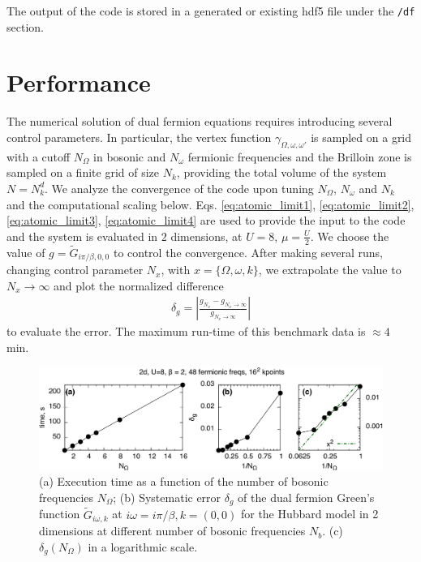\documentclass[3p,times,procedia]{elsarticle}
\begin{document}
The output of the code is stored in a generated or existing hdf5 file under the \texttt{/df} section.

\section{Performance}

The numerical solution of dual fermion equations requires introducing several control parameters. In particular,
the vertex function $\gamma_{\Omega,\omega,\omega'}$ is sampled on a grid with a cutoff $N_\Omega$ in bosonic and $N_{\omega}$ fermionic frequencies and the Brilloin zone is sampled on a finite grid of size $N_k$, providing the total volume of the system $N=N_k^d$. We analyze the convergence of the code upon tuning $N_{\Omega}$, $N_{\omega}$ and $N_k$ and the computational scaling below. Eqs. \ref{eq:atomic_limit1}, \ref{eq:atomic_limit2}, \ref{eq:atomic_limit3}, \ref{eq:atomic_limit4} are used to provide the input to the code and the system is evaluated in $2$ dimensions, at $U=8$, $\mu = \frac{U}{2}$. We choose the value of $g= \tilde G_{i\pi / \beta, 0, 0}$ to control the convergence. After making several runs, changing control parameter $N_x$, with $x = \{ \Omega, \omega, k \}$, we extrapolate the value to $N_x \to \infty$ and plot the normalized difference 
\begin{align}\label{eqn:deltag}
\delta_{g} = \left|\frac{g_{N_x} - g_{N_x \to \infty}}{g_{N_x \to \infty}}\right|
\end{align}
to evaluate the error. The maximum run-time of this benchmark data is $\approx 4$ min.

\begin{figure}[ht]
\includegraphics[width=1.0\columnwidth]{time_bfreqs.pdf}
\caption{(a) Execution time as a function of the number of bosonic frequencies $N_{\Omega}$; (b) Systematic error $\delta_g$ of the dual fermion Green's function $\tilde G_{i\omega, k}$ at $i\omega = i\pi / \beta, k = (0,0)$ for the Hubbard model in 2 dimensions at different number of bosonic frequencies $N_b$. (c) $\delta_g(N_{\Omega})$ in a logarithmic scale. }
\label{fig:benchmark_b}
\end{figure}
\end{document}

